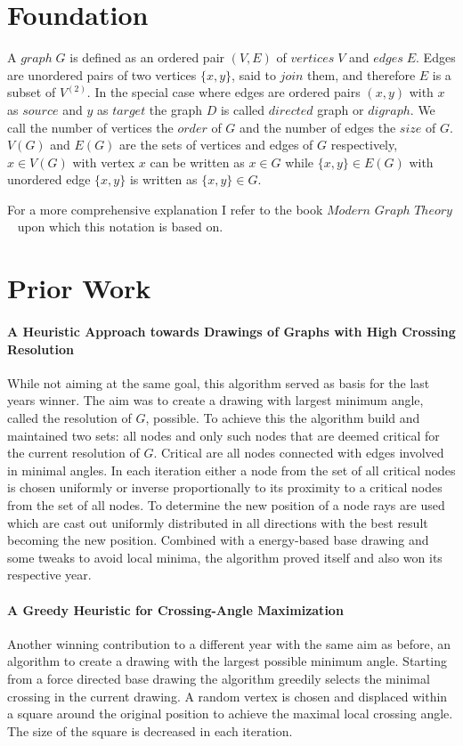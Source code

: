\documentclass[]{llncs}
\begin{document}
	\section{Foundation}
	A $graph\;G$ is defined as an ordered pair $(V, E)$ of $vertices\;V$ and $edges\;E$. Edges are unordered pairs of two vertices $\{x,y\}$, said to $join$  them, and therefore $E$ is a subset of $V^{(2)}$. In the special case where edges are ordered pairs $(x,y)$ with $x$ as $source$ and $y$ as $target$ the graph $D$ is called $directed$ graph or $digraph$. We call the number of vertices the $order$ of $G$ and the number of edges the $size$ of $G$. $V(G)$ and $E(G)$ are the sets of vertices and edges of $G$ respectively, $x \in V(G)$ with vertex $x$ can be written as $x \in G$ while $\{x, y\} \in E(G)$ with unordered edge $\{x,y\}$ is written as $\{x,y\} \in G$. 

For a more comprehensive explanation I refer to the book $Modern$ $Graph$ $Theory$~\cite{bollobas98} upon which this notation is based on.

	\section{Prior Work}
	\paragraph{A Heuristic Approach towards Drawings of
Graphs with High Crossing Resolution~\cite{journals/corr/abs-1808-10519}}
	While not aiming at the same goal, this algorithm served as basis for the last years winner. The aim was to create a drawing with largest minimum angle, called the resolution of $G$,  possible. To achieve this the algorithm build and maintained two sets: all nodes and only such nodes that are deemed critical for the current resolution of $G$. Critical are all nodes connected with edges involved in minimal angles. In each iteration either a node from the set of all critical nodes is chosen uniformly or inverse proportionally to its proximity to a critical nodes from the set of all nodes. To determine the new position of a node rays are used which are cast out uniformly distributed in all directions with the best result becoming the new position. Combined with a energy-based base drawing and some tweaks to avoid local minima, the algorithm proved itself and also won its respective year.

    \paragraph{A Greedy Heuristic for Crossing-Angle Maximization~\cite{conf/gd/DemelDMRW18}}
	Another winning contribution to a different year with the same aim as before, an algorithm to create a drawing with the largest possible minimum angle. Starting from a force directed base drawing the algorithm greedily selects the minimal crossing in the current drawing. A random vertex is chosen and displaced within a square around the original position to achieve the maximal local crossing angle. The size of the square is decreased in each iteration.
\end{document}
